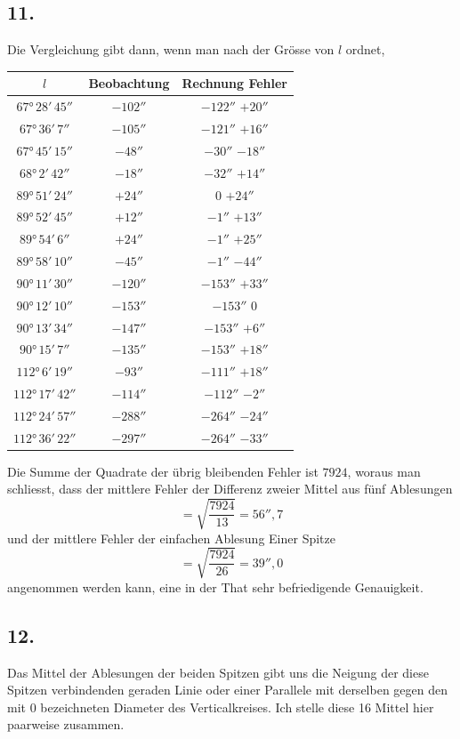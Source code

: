 \documentclass[12pt,a4paper]{article}
\begin{document}
\subsection*{11.}
Die Vergleichung gibt dann, wenn man nach der Grösse von $l$ ordnet,
\begin{center}
\small
\begin{tabular}{ccc}
$l$ & Beobachtung & Rechnung \quad Fehler \\
\midrule
$67°\,28'\,45''$ & $-102''$ & $-122''$ \quad $+20''$ \\
$67°\,36'\,7''$ & $-105''$ & $-121''$ \quad $+16''$ \\
$67°\,45'\,15''$ & $-48''$ & $-30''$ \quad $-18''$ \\
$68°\,2'\,42''$ & $-18''$ & $-32''$ \quad $+14''$ \\
$89°\,51'\,24''$ & $+24''$ & $0$ \quad $+24''$ \\
$89°\,52'\,45''$ & $+12''$ & $-1''$ \quad $+13''$ \\
$89°\,54'\,6''$ & $+24''$ & $-1''$ \quad $+25''$ \\
$89°\,58'\,10''$ & $-45''$ & $-1''$ \quad $-44''$ \\
$90°\,11'\,30''$ & $-120''$ & $-153''$ \quad $+33''$ \\
$90°\,12'\,10''$ & $-153''$ & $-153''$ \quad $0$ \\
$90°\,13'\,34''$ & $-147''$ & $-153''$ \quad $+6''$ \\
$90°\,15'\,7''$ & $-135''$ & $-153''$ \quad $+18''$ \\
$112°\,6'\,19''$ & $-93''$ & $-111''$ \quad $+18''$ \\
$112°\,17'\,42''$ & $-114''$ & $-112''$ \quad $-2''$ \\
$112°\,24'\,57''$ & $-288''$ & $-264''$ \quad $-24''$ \\
$112°\,36'\,22''$ & $-297''$ & $-264''$ \quad $-33''$
\end{tabular}
\end{center}

Die Summe der Quadrate der übrig bleibenden Fehler ist $7924$, woraus man schliesst, dass der mittlere Fehler der Differenz zweier Mittel aus fünf Ablesungen
\[ = \sqrt{\frac{7924}{13}} = 56''{,}7 \]
und der mittlere Fehler der einfachen Ablesung Einer Spitze
\[ = \sqrt{\frac{7924}{26}} = 39''{,}0 \]
angenommen werden kann, eine in der That sehr befriedigende Genauigkeit.

\subsection*{12.}
Das Mittel der Ablesungen der beiden Spitzen gibt uns die Neigung der diese Spitzen verbindenden geraden Linie oder einer Parallele mit derselben gegen den mit $0$ bezeichneten Diameter des Verticalkreises. Ich stelle diese 16 Mittel hier paarweise zusammen.
\end{document}
